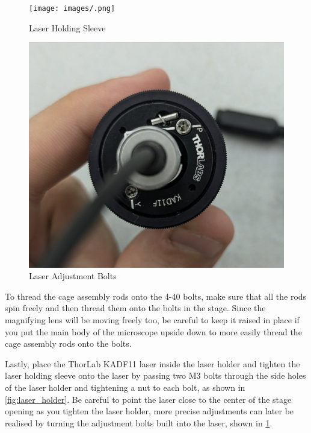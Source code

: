 \documentclass[runningheads]{llncs}
\begin{document}
\begin{figure}
    \begin{minipage}{0.3\textwidth}
        \texttt{[image: images/.png]}
        \caption{Laser Holding Sleeve}
        \label{fig:laser_holder}
        
        \vspace{5mm}

        \includegraphics[width=\linewidth]{images/laser_adjustments.png} 
        \caption{Laser Adjustment Bolts}
        \label{fig:laser_adjustments}
    \end{minipage}
\end{figure}

To thread the cage assembly rods onto the 4-40 bolts, make sure that all the rods spin freely and then thread them onto the bolts in the stage. Since the magnifying lens will be moving freely too, be careful to keep it raised in place if you put the main body of the microscope upside down to more easily thread the cage assembly rods onto the bolts. 

Lastly, place the ThorLab KADF11 laser inside the laser holder and tighten the laser holding sleeve onto the laser by passing two M3 bolts through the side holes of the laser holder and tightening a nut to each bolt, as shown in \ref{fig:laser_holder}. Be careful to point the laser close to the center of the stage opening as you tighten the laser holder, more precise adjustments can later be realised by turning the adjustment bolts built into the laser, shown in \ref{fig:laser_adjustments}.
\end{document}

